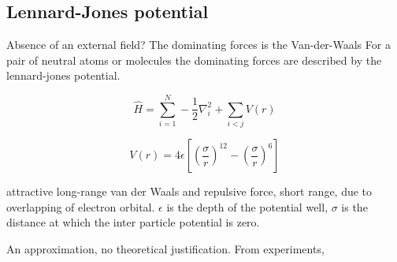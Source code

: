 \subsection{Lennard-Jones potential}

Absence of an external field? The dominating forces is the Van-der-Waals
For a pair of neutral atoms or molecules the dominating forces are described by the lennard-jones potential. 

\begin{equation} \label{eq:hamilt_box}
\hat{H} = \sum_{i=1}^N - \frac{1}{2} \nabla_i^2  + \sum_{i<j} V(r)
\end{equation}

\begin{equation} \label{eq:lennard-jones}
V(r) = 4\epsilon \left[ \left( \frac{\sigma}{r} \right)^{12} - \left( \frac{\sigma}{r} \right)^6 \right]
\end{equation}

attractive long-range van der Waals
and repulsive force, short range, due to overlapping of electron orbital.
$\epsilon$ is the depth of the potential well, $\sigma$ is the distance at which the inter particle potential is zero.

An approximation, no theoretical justification. From experiments,

